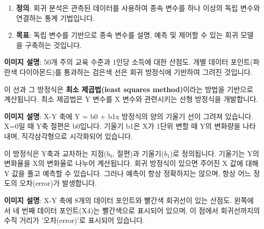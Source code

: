 \documentclass[11pt,a4paper]{article}
\theoremstyle{definition}
\begin{document}
\begin{tcolorbox}[infobox, title=회귀 방정식 (Regression Equation)]
\begin{enumerate}[label=\arabic*.]
    \item \textbf{정의}: 회귀 분석은 관측된 데이터를 사용하여 종속 변수를 하나 이상의 독립 변수와 연결하는 통계 기법입니다.
    \item \textbf{목표}: 독립 변수를 기반으로 종속 변수를 설명, 예측 및 제어할 수 있는 회귀 모델을 구축하는 것입니다.
\end{enumerate}

\begin{center}
\end{center}
\textbf{이미지 설명}: 50개 주의 교육 수준과 1인당 소득에 대한 산점도. 개별 데이터 포인트(파란색 다이아몬드)를 통과하는 검은색 선은 회귀 방정식에 기반하여 그려진 것입니다.

이 선과 그 방정식은 \textbf{최소 제곱법(least squares method)}이라는 방법을 기반으로 계산됩니다. 최소 제곱법은 Y 변수를 X 변수와 관련시키는 선형 방정식을 개발합니다.

\begin{center}
\end{center}
\textbf{이미지 설명}: X-Y 축에 Y = b0 + b1x 방정식의 양의 기울기 선이 그려져 있습니다. X=0일 때 Y축 절편은 b0입니다. 기울기 b1은 X가 1단위 변할 때 Y의 변화량을 나타내며, 직각삼각형으로 시각화되어 있습니다.

이 방정식은 Y축과 교차하는 지점($b_0$, 절편)과 기울기($b_1$)로 정의됩니다. 기울기는 Y의 변화율을 X의 변화율로 나누어 계산됩니다. 회귀 방정식이 있으면 주어진 X 값에 대해 Y 값을 풀고 예측할 수 있습니다. 그러나 예측이 항상 정확하지는 않으며, 항상 어느 정도의 오차(error)가 발생합니다.

\begin{center}
\end{center}
\textbf{이미지 설명}: X-Y 축에 8개의 데이터 포인트와 빨간색 회귀선이 있는 산점도. 왼쪽에서 네 번째 데이터 포인트(X4)는 빨간색으로 표시되어 있으며, 이 점에서 회귀선까지의 수직 거리가 '오차(error)'로 표시되어 있습니다.


\end{tcolorbox}
\end{document}
